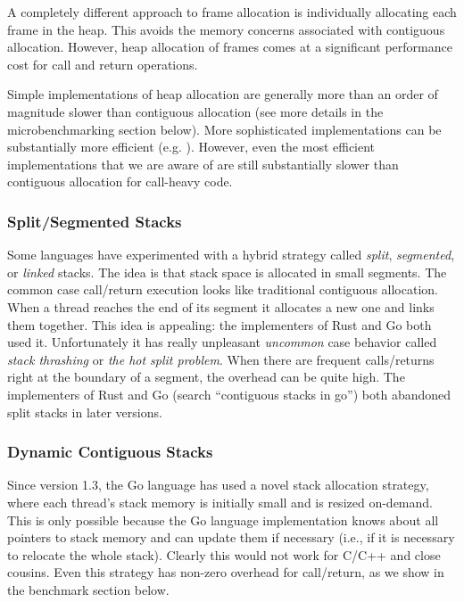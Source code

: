 \documentclass[9pt,preprint]{sigplanconf-2}
\begin{document}
A completely different approach to frame allocation is individually allocating each frame in the heap.
This avoids the memory concerns associated with contiguous allocation.
However, heap allocation of frames comes at a significant performance cost for call and return operations.

Simple implementations of heap allocation are generally more than an order of magnitude slower than contiguous allocation (see more details in the microbenchmarking section below).
More sophisticated implementations can be substantially more efficient (e.g. \cite{Shao2000}).
However, even the most efficient implementations that we are aware of are still substantially slower than contiguous allocation for call-heavy code.

\subsubsection{Split/Segmented Stacks}

Some languages have experimented with a hybrid strategy called \emph{split}, \emph{segmented}, or \emph{linked} stacks.
The idea is that stack space is allocated in small segments.
The common case call/return execution looks like traditional contiguous allocation.
When a thread reaches the end of its segment it allocates a new one and links them together.
This idea is appealing: the implementers of Rust and Go both used it.
Unfortunately it has really unpleasant \emph{uncommon} case behavior called \emph{stack thrashing} or \emph{the hot split problem}.
When there are frequent calls/returns right at the boundary of a segment, the overhead can be quite high.
The implementers of Rust \cite{Anderson2013} and Go (search ``contiguous stacks in go'') both abandoned split stacks in later versions.


\subsubsection{Dynamic Contiguous Stacks}

Since version 1.3, the Go language has used a novel stack allocation strategy, where each thread's stack memory is initially small and is resized on-demand.
This is only possible because the Go language implementation knows about all pointers to stack memory and can update them if necessary (i.e., if it is necessary to relocate the whole stack).
Clearly this would not work for C/C++ and close cousins.
Even this strategy has non-zero overhead for call/return, as we show in the benchmark section below.
\end{document}
